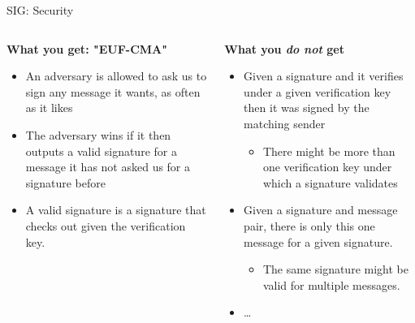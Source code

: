 \documentclass[xcolor=table,10pt,aspectratio=169]{beamer}
\begin{document}
\begin{frame}[label={sec:org74f555d}]{SIG: Security}
\begin{columns}[t]
\begin{column}{0.5\columnwidth}
\textbf{What you get: "EUF-CMA"}

\begin{itemize}
\item An adversary is allowed to ask us to sign any message it wants, as often as it likes
\item The adversary wins if it then outputs a valid signature for a message \alert{it has not asked us for a signature before}
\item A valid signature is a signature that checks out \alert{given} the verification key.
\end{itemize}
\end{column}

\begin{column}{0.5\columnwidth}
\textbf{What you \emph{do not} get}

\begin{itemize}
\item Given a signature and it verifies under a given verification key then it was signed by the matching sender
\begin{itemize}
\item There might be more than one verification key under which a signature validates
\end{itemize}
\item Given a signature and message pair, there is only this one message for a given signature.
\begin{itemize}
\item The same signature might be valid for multiple messages.
\end{itemize}
\item …
\end{itemize}
\end{column}
\end{columns}
\end{frame}
\end{document}
